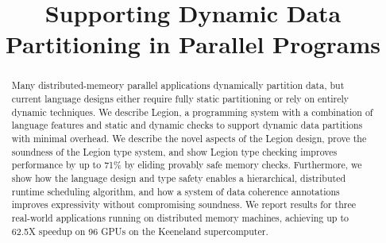 \documentclass[9pt,nocopyrightspace,preprint]{sigplanconf}
\begin{document}
\title{Supporting Dynamic Data Partitioning in Parallel Programs}
\maketitle

\begin{abstract}
Many distributed-memeory parallel applications dynamically partition 
data, but current language designs either 
require fully static partitioning or rely on entirely dynamic techniques.
We describe Legion, a programming system with a combination
of language features and static and dynamic checks to support 
dynamic data partitions with minimal overhead.
We describe the novel aspects of the Legion design, prove the soundness of the Legion type system,
 and show Legion type checking improves performance by up to 71\% by eliding provably
safe memory checks.  Furthermore, we show how the language design and type safety
enables a hierarchical, distributed runtime scheduling algorithm, and how
a system of data coherence annotations improves expressivity without compromising
soundness. We report results for three real-world applications running
on distributed memory machines, achieving up to 62.5X speedup on 96 GPUs 
on the Keeneland supercomputer.



\end{abstract}
\end{document}
